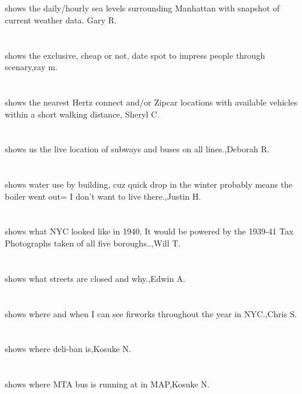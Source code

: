 \section{}shows the daily/hourly sea levels surrounding Manhattan with snapshot of current weather data. Gary R.	
\section{} shows the exclusive, cheap or not, date spot to impress people through scenary,ray m.	
\section{}shows the nearest Hertz connect and/or Zipcar locations with available vehicles within a short walking distance, Sheryl C.	
\section{}shows us the live location of subways and buses on all lines.,Deborah R.	
\section{}shows water use by building, cuz quick drop in the winter probably means the boiler went out= I don't want to live there.,Justin H.	
\section{}shows what NYC looked like in 1940.  It would be powered by the 1939-41 Tax Photographs taken of all five boroughs..,Will T.	
\section{}shows what streets are closed and why.,Edwin A.	
\section{}shows where and when I can see firworks throughout the year in NYC.,Chris S.	
\section{}shows where deli-ban is,Kosuke N.	
\section{}shows where MTA bus is running at in MAP,Kosuke N.	

